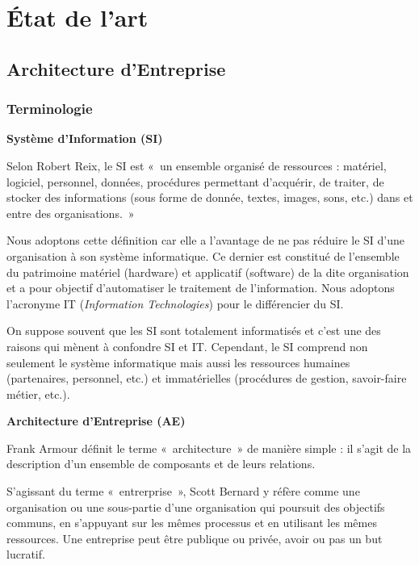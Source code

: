 \chapter{État de l'art}
\label{chap:Etat de l'art}

\section{Architecture d'Entreprise}

\subsection{Terminologie}

\textbf{Système d'Information (SI)}

Selon Robert Reix, le SI est «~un ensemble organisé de ressources : matériel, 
logiciel, personnel, données, procédures permettant d'acquérir, de traiter, de 
stocker des informations (sous forme de donnée, textes, images, sons, etc.) dans 
et entre des organisations.~»

Nous adoptons cette définition car elle a l'avantage de ne pas réduire le SI 
d'une organisation à son système informatique. Ce dernier est constitué de 
l'ensemble du patrimoine matériel (hardware) et applicatif (software) de la dite 
organisation et a pour objectif d'automatiser le traitement de l'information. 
Nous adoptons l'acronyme IT (\textit{Information Technologies}) pour le 
différencier du SI.

On suppose souvent que les SI sont totalement informatisés et c'est une des raisons qui mènent à confondre SI et IT. Cependant, le SI comprend non seulement le système informatique mais aussi les ressources humaines (partenaires, personnel, etc.) et immatérielles (procédures de gestion, savoir-faire métier, etc.).



\textbf{Architecture d'Entreprise  (AE)}

Frank Armour définit le terme «~architecture~» de manière simple \cite{armour1999bigpicture} : il s'agit de la description d'un ensemble de composants et de leurs relations.

S'agissant du terme «~entrerprise~», Scott Bernard 
\cite{bernard2012introduction} y réfère comme une
organisation ou une sous-partie d'une organisation qui poursuit des objectifs communs, en s'appuyant sur les mêmes processus et en utilisant les mêmes ressources. Une entreprise peut être publique ou privée, avoir ou pas un but lucratif. 


